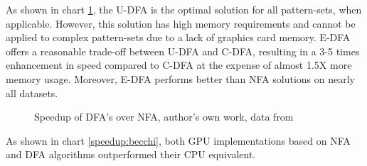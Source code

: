 \documentclass[10pt,onecolumn,twoside,english,a4paper]{article}
\begin{document}
As shown in chart \ref{speed NFA/DFA:becchi}, the U-DFA is the optimal solution for all pattern-sets, when applicable. However, this solution has high memory requirements and cannot be applied to complex pattern-sets due to a lack of graphics card memory.
E-DFA offers a reasonable trade-off between U-DFA and C-DFA, resulting in a 3-5 times enhancement in speed compared to C-DFA at the expense of almost 1.5X more memory usage. Moreover, E-DFA performs better than NFA solutions on nearly all datasets.

\begin{figure}[H]
  \centering
  \caption{Speedup of DFA's over NFA, author's own work, data from \cite{Becchi:regex_large_dataset}}
  \label{speed NFA/DFA:becchi}
\end{figure}

As shown in chart \ref{speedup:becchi}, both GPU implementations based on NFA and DFA algorithms outperformed their CPU equivalent.
\end{document}

